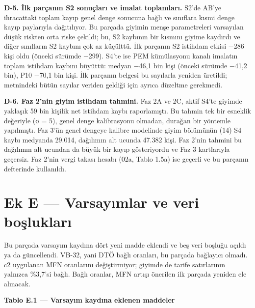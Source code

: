 \textbf{D-5. İlk parçanın S2 sonuçları ve imalat toplamları.} S2'de AB'ye ihracattaki toplam kayıp genel denge sonucuna bağlı ve sınıflara kısmi denge kayıp paylarıyla dağıtılıyor. Bu parçada giyimin menşe parametreleri varsayılan düşük riskten orta riske çekildi; bu, S2 kaybının bir kısmını giyime kaydırdı ve diğer sınıfların S2 kaybını çok az küçülttü. İlk parçanın S2 istihdam etkisi −286 kişi oldu (önceki sürümde −299). S4'te ise PEM kümülasyonu kanalı imalatın toplam istihdam kaybını büyüttü: medyan −46,1 bin kişi (önceki sürümde −41,2 bin), P10 −70,1 bin kişi. İlk parçanın belgesi bu sayılarla yeniden üretildi; metnindeki bütün sayılar veriden geldiği için ayrıca düzeltme gerekmedi.

\textbf{D-6. Faz 2'nin giyim istihdam tahmini.} Faz 2A ve 2C, aktif S4'te giyimde yaklaşık 59 bin kişilik net istihdam kaybı raporlamıştı. Bu tahmin tek bir esneklik değeriyle (σ = 5), genel denge kalibrasyonu olmadan, durağan bir yöntemle yapılmıştı. Faz 3'ün genel dengeye kalibre modelinde giyim bölümünün (14) S4 kaybı medyanda 29.014, dağılımın alt ucunda 47.382 kişi. Faz 2'nin tahmini bu dağılımın alt ucundan da büyük bir kayıp gösteriyordu ve Faz 3 kartlarıyla geçersiz. Faz 2'nin vergi takası hesabı (02a, Tablo 1.5a) ise geçerli ve bu parçanın defterinde kullanıldı.

\hypertarget{nace_kartlar_13-15-ek-e--varsayux131mlar-ve-veri-boux15fluklarux131}{%
\section{Ek E --- Varsayımlar ve veri boşlukları}\label{nace_kartlar_13-15-ek-e--varsayux131mlar-ve-veri-boux15fluklarux131}}

Bu parçada varsayım kaydına dört yeni madde eklendi ve beş veri boşluğu açıldı ya da güncellendi. VB-32, yani DTÖ bağlı oranları, bu parçada bağlayıcı olmadı. c2 uygulanan MFN oranlarını değiştirmiyor; giyimde de tarife satırlarının yalnızca \%3,7'si bağlı. Bağlı oranlar, MFN artışı önerilen ilk parçada yeniden ele alınacak.


\textbf{Tablo E.1 --- Varsayım kaydına eklenen maddeler}

\nopagebreak[4]

\begingroup\gbtablo\small

